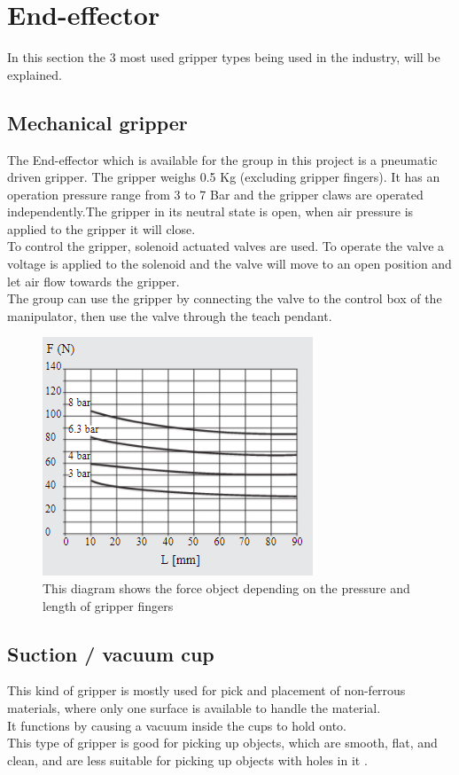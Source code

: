 \section{End-effector}

In this section the 3 most used gripper types being used in the industry, will be explained.

\subsection{Mechanical gripper}
The End-effector which is available for the group in this project is a pneumatic driven gripper. The gripper weighs 0.5 Kg (excluding gripper fingers). It has an operation pressure range from 3 to 7 Bar and the gripper claws are operated independently\cite{MWC}.The gripper in its neutral state is open, when air pressure is applied to the gripper it will close.\\
To control the gripper, solenoid actuated valves are used. To operate the valve a voltage is applied to the solenoid and the valve will move to an open position and let air flow towards the gripper.\\
The group can use the gripper by connecting the valve to the control box of the manipulator, then use the valve through the teach pendant.\\ 

\begin{figure}[H]
    \centering
    \includegraphics{TechnicalAnlysis/MWforcedia.PNG}
    \caption{This diagram shows the force object depending on the pressure and length of gripper fingers\cite{MWC}}
    \label{fig:Mvforce}
\end{figure}

\subsection{Suction / vacuum cup}
This kind of gripper is mostly used for pick and placement of non-ferrous materials, where only one surface is available to handle the material.\\ 
It functions by causing a vacuum inside the cups to hold onto.\\
This type of gripper is good for picking up objects, which are smooth, flat, and clean, and are less suitable for picking up objects with holes in it \cite{Gripper1}.\\

